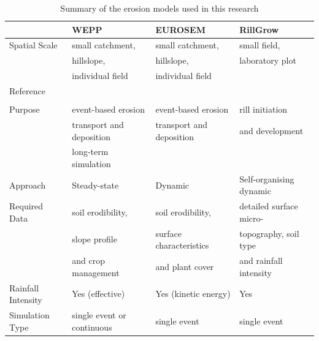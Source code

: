 \begin{table}
  \centering
  \caption{Summary of the erosion models used in this research}
  \label{tab:ModelsUsedInThePresentStudy}
    \begin{tabular}{llll}
\toprule
    & WEPP      & EUROSEM   & RillGrow\\
\midrule
Spatial Scale & small catchment,  & small catchment,  & small field,\\
    & hillslope,    & hillslope,  & laboratory plot\\
    & individual field  & individual field  & \\
\midrule
      Reference & \citealp{nearing1989-1587} &
\citealp{morgan1998-389} & \citealp{favis-mortlock1998-353}\\
                & \citealp{flanagan1995-usda} & & \\
      \midrule
      Purpose  & event-based erosion & event-based erosion &
rill initiation\\
               & transport and deposition & transport and
deposition & and development\\
               & long-term simulation & & \\
      \midrule
      Approach & Steady-state & Dynamic & Self-organising dynamic\\
      \midrule
      Required Data & soil erodibility, & soil erodibility, &
detailed surface micro-\\
                    & slope profile & surface characteristics
& topography, soil type \\
                    & and crop management   & and plant cover
& and rainfall intensity  \\
      \midrule
      Rainfall Intensity & Yes (effective) & Yes (kinetic energy) & Yes \\
      \midrule
      Simulation Type & single event or continuous & single
event & single event\\
      \bottomrule
    \end{tabular}
\end{table}

